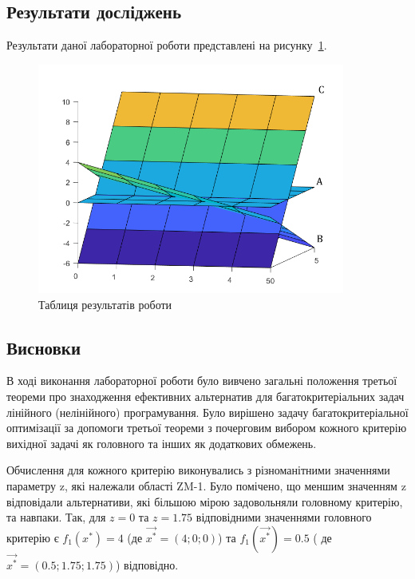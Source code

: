 \subsection{Результати досліджень}

Результати даної лабораторної роботи представлені на рисунку~\ref{fig:bounds}.

\begin{figure}[H]
  \centering
    \includegraphics[width=0.9\textwidth]{bounds}
  \caption{Таблиця результатів роботи}
  \label{fig:bounds}
\end{figure}

\subsection{Висновки}
В ході виконання лабораторної роботи було вивчено загальні положення третьої теореми про знаходження ефективних альтернатив для багатокритеріальних задач лінійного (нелінійного) програмування. 
Було вирішено задачу багатокритеріальної оптимізації за допомоги третьої теореми з почерговим вибором кожного критерію вихідної задачі як головного та інших як додаткових обмежень.

Обчислення для кожного критерію виконувались з різноманітними значеннями параметру z, які належали області ZM-1. 
Було помічено, що меншим значенням z відповідали альтернативи, які більшою мірою задовольняли головному критерію, та навпаки. 
Так, для $z = 0$ та $z = 1.75$ відповідними значеннями головного критерію є $f_1(x^*)=4$ (де $\vec{x^*}=(4; 0; 0)$) та $f_1(\vec{x^*})=0.5$ ( де $\vec{x^*}=(0.5; 1.75; 1.75)$) відповідно.



